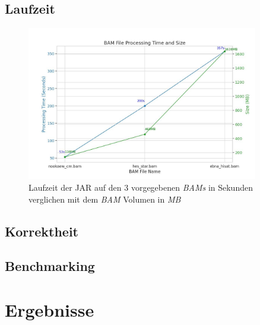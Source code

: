 \documentclass[12pt]{article}
\begin{document}
\subsection{Laufzeit}
\begin{figure}[htpb]
    \centering
    \includegraphics[width=0.9\textwidth]{./plots/times_bam.jpg}
    \caption{Laufzeit der JAR auf den 3 vorgegebenen \textit{BAMs} in Sekunden verglichen mit dem \textit{BAM} Volumen in \textit{MB} }
    \label{fig:-plots-times_bam-jpg}
\end{figure}
\subsection{Korrektheit}
\subsection{Benchmarking}
\section{Ergebnisse}
\end{document}
